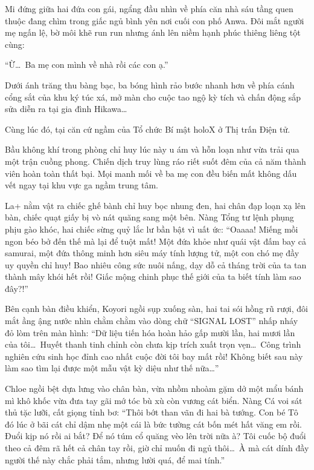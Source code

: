\documentclass[../main.tex]{subfiles}
\begin{document}
Mi đứng giữa hai đứa con gái, ngẩng đầu nhìn về phía căn nhà sáu tầng quen thuộc đang chìm trong giấc ngủ bình yên nơi cuối con phố Anwa. Đôi mắt người mẹ ngấn lệ, bờ môi khẽ run run nhưng ánh lên niềm hạnh phúc thiêng liêng tột cùng:

``Ừ\dots\ Ba mẹ con mình về nhà rồi các con ạ.''

Dưới ánh trăng thu bàng bạc, ba bóng hình rảo bước nhanh hơn về phía cánh cổng sắt của khu ký túc xá, mở màn cho cuộc tao ngộ kỳ tích và chấn động sắp sửa diễn ra tại gia đình Hikawa\dots

\ct

Cùng lúc đó, tại căn cứ ngầm của Tổ chức Bí mật holoX ở Thị trấn Điện tử.

Bầu không khí trong phòng chỉ huy lúc này u ám và hỗn loạn như vừa trải qua một trận cuồng phong. Chiến dịch truy lùng ráo riết suốt đêm của cả năm thành viên hoàn toàn thất bại. Mọi manh mối về ba mẹ con đều biến mất không dấu vết ngay tại khu vực ga ngầm trung tâm.

La+ nằm vật ra chiếc ghế bành chỉ huy bọc nhung đen, hai chân đạp loạn xạ lên bàn, chiếc quạt giấy bị vò nát quăng sang một bên. Nàng Tổng tư lệnh phụng phịu gào khóc, hai chiếc sừng quỷ lắc lư bần bật vì uất ức: ``Oaaaa! Miếng mồi ngon béo bở đến thế mà lại để tuột mất! Một đứa khỏe như quái vật đấm bay cả samurai, một đứa thông minh hơn siêu máy tính lượng tử, một con chó mẹ đầy uy quyền chỉ huy! Bao nhiêu công sức nuôi nấng, dạy dỗ cả tháng trời của ta tan thành mây khói hết rồi! Giấc mộng chinh phục thế giới của ta biết tính làm sao đây?!''

Bên cạnh bàn điều khiển, Koyori ngồi sụp xuống sàn, hai tai sói hồng rũ rượi, đôi mắt ầng ậng nước nhìn chằm chằm vào dòng chữ ``SIGNAL LOST'' nhấp nháy đỏ lòm trên màn hình: ``Dữ liệu tiến hóa hoàn hảo gấp mười lần, hai mươi lần của tôi\dots\ Huyết thanh tinh chỉnh còn chưa kịp trích xuất trọn vẹn\dots\ Công trình nghiên cứu sinh học đỉnh cao nhất cuộc đời tôi bay mất rồi! Không biết sau này làm sao tìm lại được một mẫu vật kỳ diệu như thế nữa\dots''

Chloe ngồi bệt dựa lưng vào chân bàn, vừa nhồm nhoàm gặm dở một mẩu bánh mì khô khốc vừa đưa tay gãi mớ tóc bù xù còn vương cát biển. Nàng Cá voi sát thủ tặc lưỡi, cất giọng tỉnh bơ: ``Thôi bớt than vãn đi hai bà tướng. Con bé Tô đó lúc ở bãi cát chỉ dậm nhẹ một cái là bức tường cát bốn mét hất văng em rồi. Đuổi kịp nó rồi ai bắt? Để nó túm cổ quăng vèo lên trời nữa à? Tôi cuốc bộ đuổi theo cả đêm rã hết cả chân tay rồi, giờ chỉ muốn đi ngủ thôi\dots\ À mà cát dính đầy người thế này chắc phải tắm, nhưng lười quá, để mai tính.''
\end{document}
